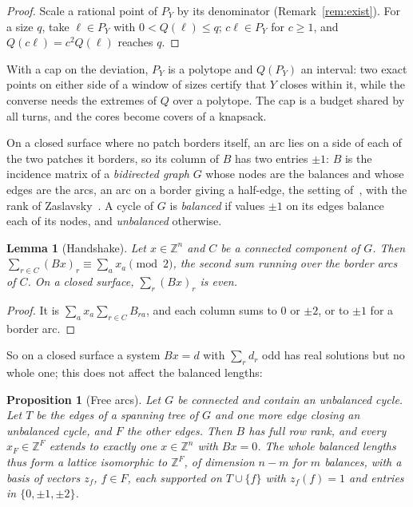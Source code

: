 \documentclass[11pt,a4paper]{article}
\newtheorem{proposition}{Proposition}
\newtheorem{lemma}{Lemma}
\newcommand{\Z}{\mathbb{Z}}
\newcommand{\lean}[1]{\texttt{\detokenize{#1}}}
\newenvironment{evidence}[3][]{}{}
\begin{document}
\begin{proof}
Scale a rational point of $P_Y$ by its denominator (Remark~\ref{rem:exist}).
For a size $q$, take $\ell \in P_Y$ with $0 < Q(\ell) \le q$; $c\ell \in P_Y$
for $c \ge 1$, and $Q(c\ell) = c^2 Q(\ell)$ reaches $q$.
\end{proof}

With a cap on the deviation, $P_Y$ is a polytope and $Q(P_Y)$ an interval: two
exact points on either side of a window of sizes certify that $Y$ closes
within it, while the converse needs the extremes of $Q$ over a polytope. The
cap is a budget shared by all turns, and the cores become covers of a
knapsack.

On a closed surface where no patch borders itself, an arc lies on a side of
each of the two patches it borders, so its column of $B$ has two entries
$\pm1$: $B$ is the incidence matrix of a \emph{bidirected graph} $G$ whose
nodes are the balances and whose edges are the arcs, an arc on a border giving
a half-edge, the setting of~\cite{heistermann2023bimdf}, with the rank of
Zaslavsky~\cite[Thm.~5.1(j), \S8A, Thm.~8B.1]{zaslavsky1982signed}.
A cycle of $G$ is \emph{balanced} if values $\pm1$ on its edges balance each
of its nodes, and \emph{unbalanced} otherwise.

\begin{evidence}{core}{\lean{TMesh.handshake}, \lean{handshake}, \lean{no_whole_solution}; assumed: a closed surface}
\begin{lemma}[Handshake]\label{lem:handshake}
Let $x \in \Z^n$ and $C$ be a connected component of $G$. Then $\sum_{r \in C}
(Bx)_r \equiv \sum_{a} x_a \pmod 2$, the second sum running over the border
arcs of $C$. On a closed surface, $\sum_r (Bx)_r$ is even.
\end{lemma}
\end{evidence}

\begin{proof}
It is $\sum_a x_a \sum_{r \in C} B_{ra}$, and each column sums to $0$ or
$\pm2$, or to $\pm1$ for a border arc.
\end{proof}

So on a closed surface a system $Bx = d$ with $\sum_r d_r$ odd has real
solutions but no whole one; this does not affect the balanced lengths:

\begin{evidence}{core}{\lean{TMesh.free_arcs}, \lean{free_arcs}, \lean{free_arcs_of_cycle}; assumed: the graph is connected (a spanning tree)}
\begin{proposition}[Free arcs]\label{prop:free}
Let $G$ be connected and contain an unbalanced cycle. Let $T$ be the edges of a
spanning tree of $G$ and one more edge closing an unbalanced cycle, and $F$ the
other edges. Then $B$ has full row rank, and every $x_F \in \Z^F$ extends to
exactly one $x \in \Z^n$ with $Bx = 0$. The whole balanced lengths thus form a
lattice isomorphic to $\Z^F$, of dimension $n - m$ for $m$ balances, with a
basis of vectors $z_f$, $f \in F$, each supported on $T \cup \{f\}$ with
$z_f(f) = 1$ and entries in $\{0, \pm1, \pm2\}$.
\end{proposition}
\end{evidence}
\end{document}
